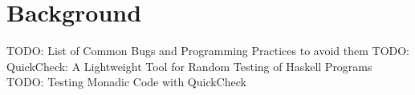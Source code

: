 \section{Background}
TODO: List of Common Bugs and Programming Practices to avoid them \cite{vipindeep_list_2005}
TODO: QuickCheck: A Lightweight Tool for Random Testing of Haskell Programs \cite{claessen_quickcheck:_2000}
TODO: Testing Monadic Code with QuickCheck \cite{claessen_testing_2002}
